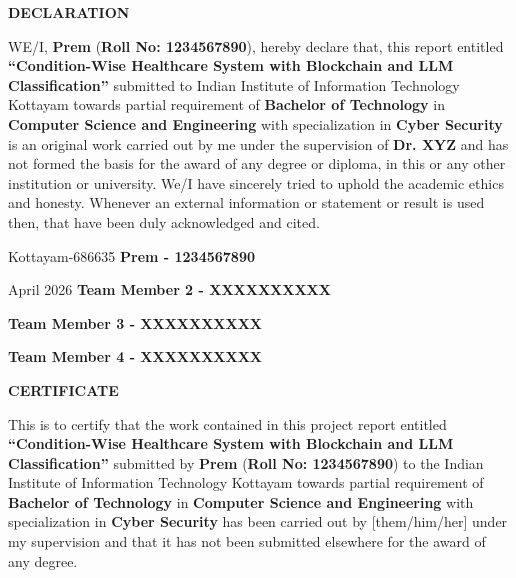 \documentclass[12pt]{report}
\theoremstyle{plain}
\theoremstyle{definition}
\theoremstyle{remark}
\begin{document}
\clearpage
 \setcounter{page}{2}
\begin{center}
{\large{\bf{DECLARATION}}}
\end{center}


\noindent WE/I, \textbf{Prem} (\textbf{Roll No: 1234567890}), hereby declare that, this report entitled
\textbf{``Condition-Wise Healthcare System with Blockchain and LLM Classification''} submitted to Indian
Institute of Information Technology Kottayam towards partial
requirement of {\bf Bachelor of Technology} in \textbf{Computer Science and Engineering} with specialization in \textbf{Cyber Security} is an original work carried out by me under the supervision of \textbf{Dr. XYZ} and has not formed the basis for the award of any degree or diploma, in this or any other institution or
university. We/I have sincerely tried to uphold the academic ethics
and honesty. Whenever an external information or statement or
result is used then, that have been duly acknowledged and cited.

\vspace{4cm}

\noindent Kottayam-686635 \hfill \textbf{Prem - 1234567890}

\noindent April 2026      \hfill \textbf{Team Member 2 - XXXXXXXXXX}

\noindent									\hfill \textbf{Team Member 3 - XXXXXXXXXX}

\noindent									\hfill \textbf{Team Member 4 - XXXXXXXXXX}

\clearpage


 \setcounter{page}{3}
\begin{center}
{\large{\bf{CERTIFICATE}}}
\end{center}


\noindent This is to certify that the work contained in this
project report entitled \textbf{``Condition-Wise Healthcare System with Blockchain and LLM Classification''}
submitted by \textbf{Prem} (\textbf{Roll No: 1234567890}) to the Indian Institute of Information Technology Kottayam
towards partial requirement of {\bf Bachelor of Technology} in \textbf{Computer Science and Engineering} with specialization in \textbf{Cyber Security} has been carried out by [them/him/her] under my
supervision and that it has not been submitted elsewhere for the
award of any degree.
\end{document}
